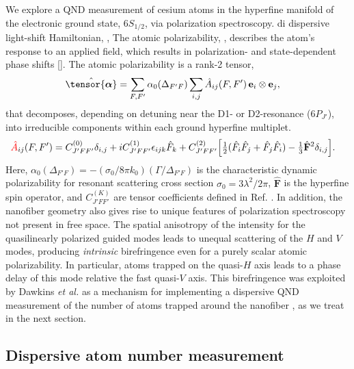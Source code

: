 \documentclass[preprint,aps,pra,onecolumn]{revtex4-1} %
\newcommand{\poltens}{\hat{\tensor{\boldsymbol{\alpha}}}}
\newcommand{\charpol}{\alpha_0(\Delta_{F'F})}
\newcommand{\error}[1]{{\color{red} #1}}
\begin{document}
We explore a QND measurement of cesium atoms in the hyperfine manifold of the electronic ground state, $6S_{1/2}$, via polarization spectroscopy.  di dispersive light-shift Hamiltonian, , The atomic polarizability, , describes the atom's response to an applied field, which results in polarization- and state-dependent phase shifts [].  The atomic polarizability is a rank-2 tensor,
	\begin{align}
		\poltens %
		&=  \sum_{F,F'} \charpol \sum_{i,j} \hat{A}_{ij}(F,F') \, \mathbf{e}_i \otimes \mathbf{e}_j,
	\end{align}
that decomposes, depending on detuning near the D1- or D2-resonance ($6P_{J'}$), into irreducible components within each ground hyperfine multiplet.  
	\begin{align}
		\error{\hat{A}}_{ij}(F,F')&=  C_{J'FF'}^{(0)} \delta_{i,j}+ iC_{J'FF'}^{(1)}\epsilon_{ijk}\hat{F}_k+ C_{J'FF'}^{(2)} \Big[ \smallfrac{1}{2} ( \hat{F}_i\hat{F}_j +\hat{F}_j\hat{F}_i )-\smallfrac{1}{3}\hat{\mathbf{F}}^2 \delta_{i,j} \Big]. \label{Eq::PolarizabilityIrrep}
\end{align}
Here, $\charpol = -(\sigma_0/8\pi k_0) (\Gamma/\Delta_{F'F})$ is the characteristic dynamic polarizability for resonant scattering cross section $\sigma_0 = 3 \lambda^2/2\pi$, $\hat{\mathbf{F}}$ is the hyperfine spin operator, and $C_{J'FF'}^{(K)}$ are tensor coefficients defined in Ref. \cite{deutsch_quantum_2010}.  In addition, the nanofiber geometry also gives rise to unique features of polarization spectroscopy not present in free space.  The spatial anisotropy of the intensity for the quasilinearly polarized guided modes leads to unequal scattering of the $H$ and $V$ modes, producing \emph{intrinsic} birefringence even for a purely scalar atomic polarizability.  In particular, atoms trapped on the quasi-$H$ axis leads to a phase delay of this mode relative the fast quasi-$V$ axis. This birefringence was exploited by Dawkins {\em et al.} as a mechanism for implementing a dispersive QND measurement of the number of atoms trapped around the nanofiber \cite{dawkins_dispersive_2011}, as we treat in the next section. 

	\subsection{Dispersive atom number measurement} \label{Sec::AtomNumberMeasurement}
\end{document}
